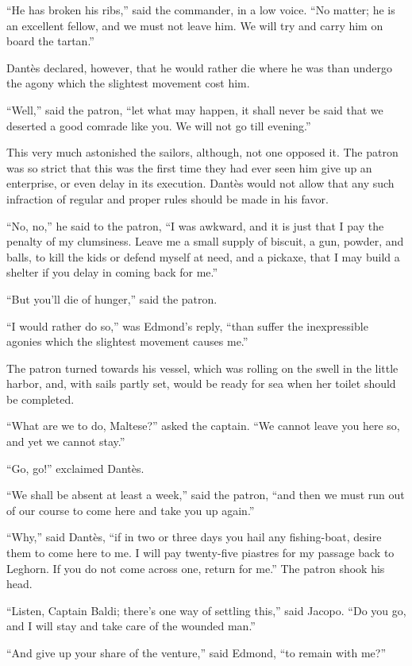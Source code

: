“He has broken his ribs,” said the commander, in a low voice. “No
matter; he is an excellent fellow, and we must not leave him. We will
try and carry him on board the tartan.”

Dantès declared, however, that he would rather die where he was than
undergo the agony which the slightest movement cost him.

“Well,” said the patron, “let what may happen, it shall never be said
that we deserted a good comrade like you. We will not go till evening.”

This very much astonished the sailors, although, not one opposed it.
The patron was so strict that this was the first time they had ever
seen him give up an enterprise, or even delay in its execution. Dantès
would not allow that any such infraction of regular and proper rules
should be made in his favor.

“No, no,” he said to the patron, “I was awkward, and it is just that I
pay the penalty of my clumsiness. Leave me a small supply of biscuit, a
gun, powder, and balls, to kill the kids or defend myself at need, and
a pickaxe, that I may build a shelter if you delay in coming back for
me.”

“But you’ll die of hunger,” said the patron.

“I would rather do so,” was Edmond’s reply, “than suffer the
inexpressible agonies which the slightest movement causes me.”

The patron turned towards his vessel, which was rolling on the swell in
the little harbor, and, with sails partly set, would be ready for sea
when her toilet should be completed.

“What are we to do, Maltese?” asked the captain. “We cannot leave you
here so, and yet we cannot stay.”

“Go, go!” exclaimed Dantès.

“We shall be absent at least a week,” said the patron, “and then we
must run out of our course to come here and take you up again.”

“Why,” said Dantès, “if in two or three days you hail any fishing-boat,
desire them to come here to me. I will pay twenty-five piastres for my
passage back to Leghorn. If you do not come across one, return for me.”
The patron shook his head.

“Listen, Captain Baldi; there’s one way of settling this,” said Jacopo.
“Do you go, and I will stay and take care of the wounded man.”

“And give up your share of the venture,” said Edmond, “to remain with
me?”

